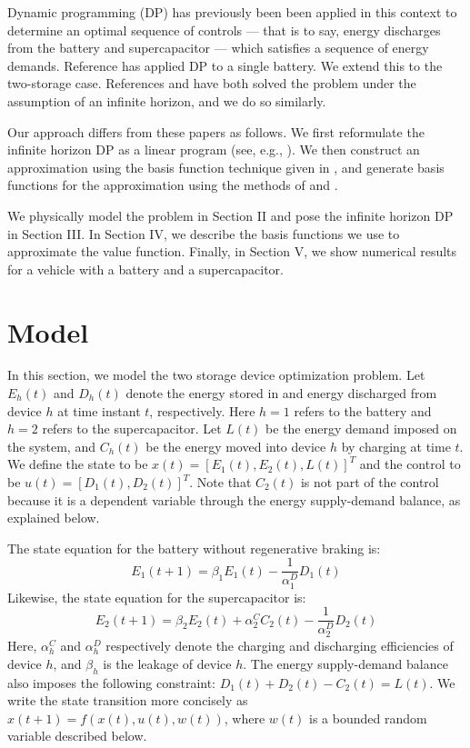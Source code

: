 \documentclass[conference]{IEEEtran}
\begin{document}
Dynamic programming (DP) has previously been been applied in this context to determine an optimal sequence of controls --- that is to say, energy discharges from the battery and supercapacitor --- which satisfies a sequence of energy demands. Reference \cite{su2013modeling} has applied DP to a single battery. We extend this to the two-storage case. References \cite{8330176} and \cite{8315074} have both solved the problem under the assumption of an infinite horizon, and we do so similarly.

Our approach differs from these papers as follows. We first reformulate the infinite horizon DP as a linear program (see, e.g., \cite{Bertsekas:2007:DPO:1396348}). We then construct an approximation using the basis function technique given in \cite{deFarias:2003:LPA:970869.970918}, and generate basis functions for the approximation using the methods of \cite{Bellman:1957} and \cite{Bellman1962}. %

We physically model the problem in Section II and pose the infinite horizon DP in Section III. In Section IV, we describe the basis functions we use to approximate the value function. Finally, in Section V, we show numerical results for a vehicle with a battery and a supercapacitor. 


\section{Model}
In this section, we model the two storage device optimization problem. Let $E_{h}(t)$ and $D_{h}(t)$ denote the energy stored in and energy discharged from device $h$ at time instant $t$, respectively. Here $h=1$ refers to the battery and $h=2$ refers to the supercapacitor. Let $L(t)$ be the energy demand imposed on the system, and $C_{h}(t)$ be the energy moved into device $h$ by charging at time $t$. We define the state to be $x(t)=[E_{1}(t),E_{2}(t),L(t)]^{T}$ and the control to be $u(t)=[D_{1}(t),D_{2}(t)]^{T}$. Note that $C_{2}(t)$ is not part of the control because it is a dependent variable through the energy supply-demand balance, as explained below.

The state equation for the battery without regenerative braking is:
\begin{equation} \label{eq:BattStateEqn}
    E_{1}(t+1)=\beta_{1}E_{1}(t)-\frac{1}{\alpha_{1}^{D}}D_{1}(t)
\end{equation} Likewise, the state equation for the supercapacitor is:
\begin{equation} \label{eq:SupercStateEqn}
    E_{2}(t+1)=\beta_{2}E_{2}(t)+\alpha_{2}^{C}C_{2}(t)-\frac{1}{\alpha_{2}^{D}}D_{2}(t)
\end{equation} Here, $\alpha^{C}_{h}$ and $\alpha^{D}_{h}$ respectively denote the charging and discharging efficiencies of device $h$, and $\beta_{h}$ is the leakage of device $h$. The energy supply-demand balance also imposes the following constraint: $D_{1}(t) + D_{2}(t) - C_{2}(t) = L(t)$. We write the state transition more concisely as $x(t+1)=f(x(t),u(t),w(t))$, where $w(t)$ is a bounded random variable described below.
\end{document}
